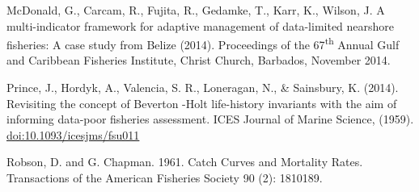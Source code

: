\documentclass[]{book}
\begin{document}
McDonald, G., Carcam, R., Fujita, R., Gedamke, T., Karr, K., Wilson, J.
A multi-indicator framework for adaptive management of data-limited
nearshore fisheries: A case study from Belize (2014). Proceedings of the
67\textsuperscript{th} Annual Gulf and Caribbean Fisheries Institute,
Christ Church, Barbados, November 2014.

Prince, J., Hordyk, A., Valencia, S. R., Loneragan, N., \& Sainsbury, K.
(2014). Revisiting the concept of Beverton -Holt life-history invariants
with the aim of informing data-poor fisheries assessment. ICES Journal
of Marine Science, (1959). \url{doi:10.1093/icesjms/fsu011}

Robson, D. and G. Chapman. 1961. Catch Curves and Mortality Rates.
Transactions of the American Fisheries Society 90 (2): 1810189.


\end{document}
